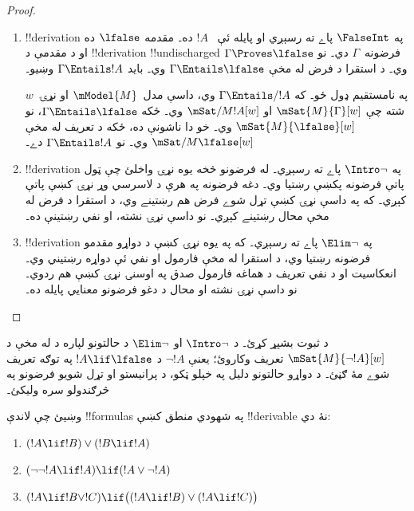 \documentclass[../../../include/open-logic-section]{subfiles}
\begin{document}
\begin{proof}
\begin{enumerate}
    $\mSat{M}{\Gamma \cup \Delta}[w]$ فرض کړئ۔ ځکه
    $\mSat{M}{\Gamma}[w]$ او $\Gamma \Entails !B \lif !C$
    دي، نو $\mSat{M}{!B \lif !C}[w]$ وي۔ د تعريف له مخې د هر
    داسې $w'$ لپاره چې $Rww'$ وي، که $\mSat{M}{!B}[w']$ وي،
    نو $\mSat{M}{!C}[w']$ وي۔ څرنګه چې $R$ انعکاسي ده، $w$
    هم په هغو $w'$ کښې دے چې $Rww'$ لري؛ يعنې که
    $\mSat{M}{!B}[w]$ وي، نو $\mSat{M}{!C}[w]$ وي۔ ځکه
    $\mSat{M}{\Delta}[w]$ او $\Delta \Entails !B$ دي، نو
    $\mSat{M}{!B}[w]$ وي۔ نو $\mSat{M}{!C}[w]$ شو؛ همدا مو
    غوښتل۔

  \item !!{derivation} په $\FalseInt$ پاے ته رسېږي او پايله ئې
    ~$!A$ ده۔ مقدمه $\lfalse$ ده او د مقدمې د !!{derivation}
    !!{undischarged} فرضونه~$\Gamma$ دي۔ نو $\Gamma \Proves
    \lfalse$ وي۔ د استقرا د فرض له مخې
    $\Gamma \Entails \lfalse$ وي۔ بايد $\Gamma \Entails !A$
    وښيو۔

    په نامستقيم ډول ځو۔ که $\Gamma \Entails/ !A$ وي، داسې
    مدل~$\mModel{M}$ او نړۍ~$w$ شته چې
    $\mSat{M}{\Gamma}[w]$ او $\mSat/{M}{!A}[w]$ وي۔ ځکه
    $\Gamma \Entails \lfalse$، نو $\mSat{M}{\lfalse}[w]$
    وي۔ خو دا ناشونې ده، ځکه د تعريف له مخې
    $\mSat/{M}{\lfalse}[w]$ وي۔ نو $\Gamma \Entails !A$ دے۔
  \item !!{derivation} په $\Intro\lnot$ پاے ته رسېږي۔ له فرضونو
    څخه يوه نړۍ واخلئ چې ټول پاتې فرضونه پکښې رښتيا وي۔
    دغه فرضونه په هرې د لاسرسي وړ نړۍ کښې پاتې کېږي۔ که په داسې
    نړۍ کښې تړل شوے فرض هم رښتينے وي، د استقرا د فرض له مخې
    محال رښتينے کېږي۔ نو داسې نړۍ نشته، او نفي رښتينې ده۔
  \item !!{derivation} په $\Elim\lnot$ پاے ته رسېږي۔ که په يوه
    نړۍ کښې د دواړو مقدمو فرضونه رښتيا وي، د استقرا له مخې
    فارمول او نفي ئې دواړه رښتيني وي۔ انعکاسيت او د نفي
    تعريف د هماغه فارمول صدق په اوسنۍ نړۍ کښې هم ردوي۔ نو
    داسې نړۍ نشته او محال د دغو فرضونو معنايي پايله ده۔
  \end{enumerate}
\end{proof}

\begin{prob}
  د  ثبوت بشپړ کړئ۔ د
  $\Intro\lnot$ او $\Elim\lnot$ د حالتونو لپاره د
   له مخې د
  $\mSat{M}{\lnot !A}[w]$ تعريف وکاروئ؛ يعنې $\lnot !A$ د
  $!A \lif \lfalse$ په توګه تعريف شوے مۀ ګڼئ۔ د دواړو حالتونو
  دليل په خپلو ټکو، د پرانيستو او تړل شويو فرضونو په څرګندولو
  سره وليکئ۔
\end{prob}

\begin{prob}
  وښيئ چې لاندې !!{formula}s په شهودي منطق کښې !!{derivable} نۀ دي:
  \begin{enumerate}
    \item $(!A \lif !B) \lor (!B \lif !A)$
    \item $(\lnot\lnot !A \lif !A) \lif (!A \lor \lnot !A)$
    \item $(!A \lif !B \lor !C) \lif \bigl((!A \lif !B)\lor(!A \lif !C)\bigr)$
  \end{enumerate}
\end{prob}
\end{document}

